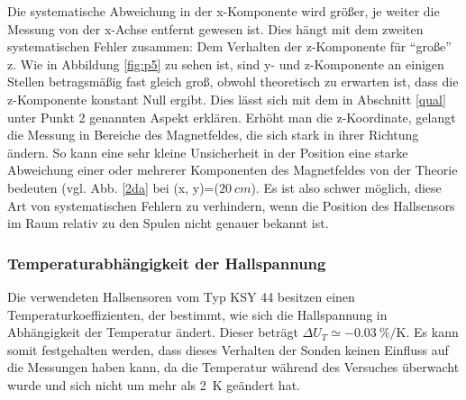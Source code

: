 \documentclass[12pt,a4paper]{article}
\begin{document}
Die systematische Abweichung in der x-Komponente wird größer, je weiter die Messung von der x-Achse entfernt gewesen ist. Dies hängt mit dem zweiten systematischen Fehler zusammen: Dem Verhalten der z-Komponente für "`große"' z. Wie in Abbildung \ref{fig:p5} zu sehen ist, sind y- und z-Komponente an einigen Stellen betragsmäßig fast gleich groß, obwohl theoretisch zu erwarten ist, dass die z-Komponente konstant Null ergibt. Dies lässt sich mit dem in Abschnitt  \ref{qual} unter Punkt 2 genannten Aspekt erklären. Erhöht man die z-Koordinate, gelangt die Messung in Bereiche des Magnetfeldes, die sich stark in ihrer Richtung ändern. So kann eine sehr kleine Unsicherheit in der Position eine starke Abweichung einer oder mehrerer Komponenten des Magnetfeldes von der Theorie bedeuten (vgl. Abb. \ref{2da} bei (x, y)=($\SI{20}{cm}$). Es ist also schwer möglich, diese Art von systematischen Fehlern zu verhindern, wenn die Position des Hallsensors im Raum relativ zu den Spulen nicht genauer bekannt ist.
\subsubsection*{Temperaturabhängigkeit der Hallspannung}
Die verwendeten Hallsensoren vom Typ KSY 44 besitzen einen Temperaturkoeffizienten, der bestimmt, wie sich die Hallspannung in Abhängigkeit der Temperatur ändert. Dieser beträgt $\Delta U_T \simeq -0.03\ \% / \text{K}$. Es kann somit festgehalten werden, dass dieses Verhalten der Sonden keinen Einfluss auf die Messungen haben kann, da die Temperatur während des Versuches überwacht wurde und sich nicht um mehr als \SI{2}{\kelvin} geändert hat.
\end{document}
